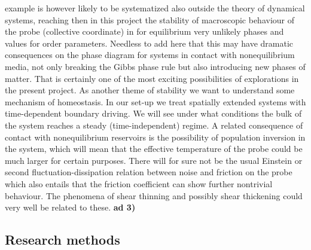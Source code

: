 example is however likely to be systematized also outside the theory of dynamical systems,
reaching then in this project the stability of macroscopic behaviour of the probe
(collective coordinate) in for equilibrium very unlikely phases and values for order
parameters.  Needless to add here that this may have dramatic consequences on the phase
diagram for systems in contact with nonequilibrium media, not only breaking the Gibbs phase
rule but also introducing new phases of matter.  That is certainly one of the most exciting
possibilities of explorations in the present project. As another theme of stability we want
to understand some mechanism of homeostasis. In our set-up we treat spatially extended
systems with time-dependent boundary driving. We will see under what conditions the bulk of
the system reaches a steady (time-independent) regime. A related consequence of contact with
nonequilibrium reservoirs is the possibility of population inversion in the system, which
will mean that the effective temperature of the probe could be much larger for certain
purposes.  There will for sure not be the usual Einstein or second fluctuation-dissipation
relation between noise and friction on the probe which also entails that the friction
coefficient can show further nontrivial behaviour.  The phenomena of shear thinning and
possibly shear thickening could very well be related to these.
%
{\bf ad 3)}



\subsection{Research methods}\label{sec:methods}

